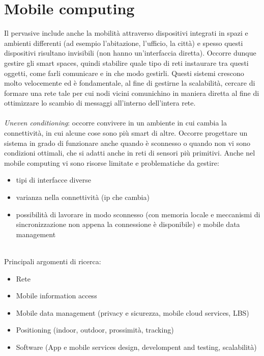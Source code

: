 \section{Mobile computing}
Il pervasive include anche la mobilità attraverso dispositivi integrati in spazi e ambienti differenti (ad esempio l'abitazione, l'ufficio, la città) e spesso questi dispositivi risultano invisibili (non hanno un'interfaccia diretta). Occorre dunque gestire gli smart spaces, quindi stabilire quale tipo di reti instaurare tra questi oggetti, come farli comunicare e in che modo gestirli. Questi sistemi crescono molto velocemente ed è fondamentale, al fine di gestirne la scalabilità, cercare di formare una rete tale per cui nodi vicini comunichino in maniera diretta al fine di ottimizzare lo scambio di messaggi all'interno dell'intera rete.
\\
\\
\textit{Uneven conditioning}: occorre convivere in un ambiente in cui cambia la connettività, in cui alcune cose sono più smart di altre. Occorre progettare un sistema in grado di funzionare anche quando è sconnesso o quando non vi sono condizioni ottimali, che si adatti anche in reti di sensori più primitivi.
\newpage
Anche nel mobile computing vi sono risorse limitate e problematiche da gestire:
\begin{itemize}
    \item tipi di interfacce diverse
    \item varianza nella connettività (ip che cambia)
    \item possibilità di lavorare in modo sconnesso (con memoria locale e meccanismi di sincronizzazione non appena la connessione è disponibile) e mobile data management
\end{itemize}
\phantom \\

Principali argomenti di ricerca:
\begin{itemize}
    \item Rete
    \item Mobile information access
    \item Mobile data management (privacy e sicurezza, mobile cloud services, LBS)
    \item Positioning (indoor, outdoor, prossimità, tracking)
    \item Software (App e mobile services design, develompent and testing, scalabilità)
\end{itemize}


